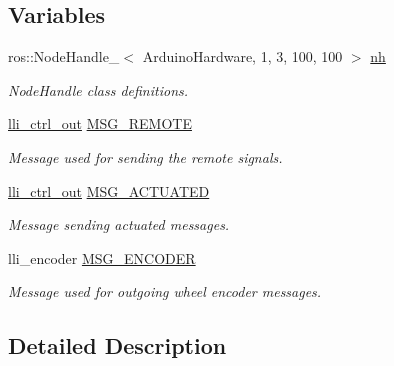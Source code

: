 \subsection*{Variables}
\begin{DoxyCompactItemize}
\item 
ros\+::\+Node\+Handle\+\_\+$<$ Arduino\+Hardware, 1, 3, 100, 100 $>$ \hyperlink{group__ROSSetup_ga9518748567d9dc49cb5d062ae16eccac}{nh}\hypertarget{group__ROSSetup_ga9518748567d9dc49cb5d062ae16eccac}{}\label{group__ROSSetup_ga9518748567d9dc49cb5d062ae16eccac}

\begin{DoxyCompactList}\small\item\em Node\+Handle class definitions. \end{DoxyCompactList}\item 
\hyperlink{svea__arduino__src_8h_a6b033df4aed2c02e82dc2962f73c2ccb}{lli\+\_\+ctrl\+\_\+out} \hyperlink{group__ROSSetup_gad1e4ff3dbb3ddc9a6fadfcc80b6b6b20}{M\+S\+G\+\_\+\+R\+E\+M\+O\+TE}\hypertarget{group__ROSSetup_gad1e4ff3dbb3ddc9a6fadfcc80b6b6b20}{}\label{group__ROSSetup_gad1e4ff3dbb3ddc9a6fadfcc80b6b6b20}

\begin{DoxyCompactList}\small\item\em Message used for sending the remote signals. \end{DoxyCompactList}\item 
\hyperlink{svea__arduino__src_8h_a6b033df4aed2c02e82dc2962f73c2ccb}{lli\+\_\+ctrl\+\_\+out} \hyperlink{group__ROSSetup_ga7b886027c8fb98155a2757bc5be08615}{M\+S\+G\+\_\+\+A\+C\+T\+U\+A\+T\+ED}\hypertarget{group__ROSSetup_ga7b886027c8fb98155a2757bc5be08615}{}\label{group__ROSSetup_ga7b886027c8fb98155a2757bc5be08615}

\begin{DoxyCompactList}\small\item\em Message sending actuated messages. \end{DoxyCompactList}\item 
lli\+\_\+encoder \hyperlink{group__ROSSetup_ga46e4ead0cae634e475c6606dd97cc393}{M\+S\+G\+\_\+\+E\+N\+C\+O\+D\+ER}\hypertarget{group__ROSSetup_ga46e4ead0cae634e475c6606dd97cc393}{}\label{group__ROSSetup_ga46e4ead0cae634e475c6606dd97cc393}

\begin{DoxyCompactList}\small\item\em Message used for outgoing wheel encoder messages. \end{DoxyCompactList}\end{DoxyCompactItemize}


\subsection{Detailed Description}
